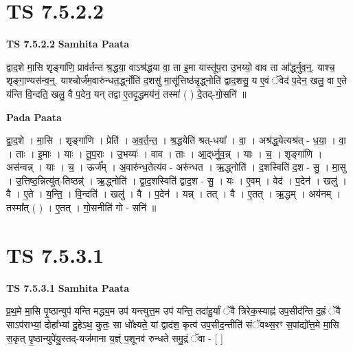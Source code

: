 \documentclass[17pt]{extarticle}
\begin{document}

\section{ TS 7.5.2.2 }

\textbf{TS 7.5.2.2 } \newline
\textbf{Samhita Paata} \newline

द्वाद॒शे मा॒सि शृङ्गा॑णि॒ प्राव॑र्तन्त श्र॒द्धया॒ वाऽश्र॑द्धया वा॒ ता इ॒मा यास्तू॑प॒रा उ॒भय्यो॒ वाव ता आ᳚र्द्ध्नुव॒न्॒. याश्च॒ शृङ्गा॒ण्यस॑न्व॒न्॒. याश्चोर्ज॑म॒वारु॑न्धत॒र्द्ध्नोति॑ द॒शसु॑ मा॒सू᳚त्तिष्ठ॑न्नृ॒द्ध्नोति॑ द्वाद॒शसु॒ य ए॒वं ॅवेद॑ प॒देन॒ खलु॒ वा ए॒ते य॑न्ति वि॒न्दति॒ खलु॒ वै प॒देन॒ यन् तद्वा ए॒तदृ॒द्धमय॑नं॒ तस्मा॑ ( ) दे॒तद्-गो॒सनि॑ ॥ \newline

\textbf{Pada Paata} \newline

द्वा॒द॒शे । मा॒सि । शृङ्गा॑णि । प्रेति॑ । अ॒व॒र्त॒न्त॒ । श्र॒द्धयेति॑ श्रत्-धया᳚ । वा॒ । अश्र॑द्ध॒येत्यश्र॑त् - ध॒या॒ । वा॒ । ताः । इ॒माः । याः । तू॒प॒राः । उ॒भय्यः॑ । वाव । ताः । आ॒द्‌र्ध्नु॒व॒न्न् । याः । च॒ । शृङ्गा॑णि । अस॑न्वन्न् । याः । च॒ । ऊर्ज᳚म् । अ॒वारु॑न्ध॒तेत्य॑व - अरु॑न्धत । ऋ॒द्ध्नोति॑ । द॒शस्विति॑ द॒श - सु॒ । मा॒सु । उ॒त्तिष्ठ॒न्नित्यु॑त्-तिष्ठन्न्॑ । ऋ॒द्ध्नोति॑ । द्वा॒द॒शस्विति॑ द्वाद॒श - सु॒ । यः । ए॒वम् । वेद॑ । प॒देन॑ । खलु॑ । वै । ए॒ते । य॒न्ति॒ । वि॒न्दति॑ । खलु॑ । वै । प॒देन॑ । यन्न् । तत् । वै । ए॒तत् । ऋ॒द्धम् । अय॑नम् । तस्मा᳚त् ( ) । ए॒तत् । गो॒सनीति॑ गो - सनि॑ ॥  \newline





\section{ TS 7.5.3.1 }

\textbf{TS 7.5.3.1 } \newline
\textbf{Samhita Paata} \newline

प्र॒थ॒मे मा॒सि पृ॒ष्ठान्युप॑ यन्ति मद्ध्य॒म उप॑ यन्त्युत्त॒म उप॑ यन्ति॒ तदा॑हु॒र्यां ॅवै त्रिरेक॒स्याह्न॑ उप॒सीद॑न्ति द॒ह्रं ॅवै साऽप॑राभ्यां॒ दोहा᳚भ्यां दु॒हेऽथ॒ कुतः॒ सा धो᳚क्ष्यते॒ यां द्वाद॑श॒ कृत्व॑ उप॒सीद॒न्तीति॑ संॅवथ्स॒रꣳ स॒पांद्यो᳚त्त॒मे मा॒सि स॒कृत् पृ॒ष्ठान्युपे॑यु॒स्तद्-यज॑माना य॒ज्ञ्ं प॒शूनव॑ रुन्धते समु॒द्रं ॅवा - [  ] \newline
\end{document}
